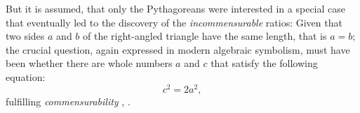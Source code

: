\documentclass[11pt]{amsart}
\theoremstyle{definition}
\begin{document}
But it is assumed, that only the Pythagoreans were interested in a special case that eventually led to the discovery of the \emph{incommensurable} ratios: Given that two sides \(a\) and \(b\) of the right-angled triangle have the same length, that is \(a = b\); the crucial question, again expressed in modern algebraic symbolism, must have been whether there are whole numbers \(a\) and \(c\) that satisfy the following equation:
\begin{equation}
    c^{2} = 2a^{2},
\end{equation}
fulfilling \emph{commensurability} \cite[6-7]{stillwellStoryProofLogic2022}, \cite[58]{courantWhatMathematicsElementary1996}.

\end{document}
